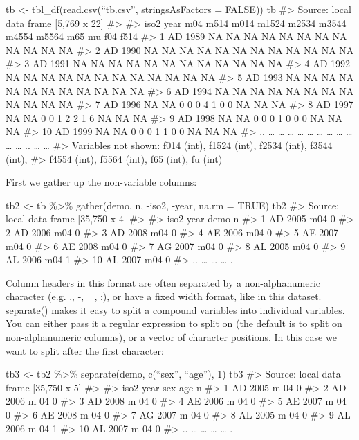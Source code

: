 \documentclass[]{article}
\begin{document}
tb \textless{}- tbl\_df(read.csv(``tb.csv'', stringsAsFactors = FALSE))
tb \#\textgreater{} Source: local data frame {[}5,769 x 22{]}
\#\textgreater{} \#\textgreater{} iso2 year m04 m514 m014 m1524 m2534
m3544 m4554 m5564 m65 mu f04 f514 \#\textgreater{} 1 AD 1989 NA NA NA NA
NA NA NA NA NA NA NA NA \#\textgreater{} 2 AD 1990 NA NA NA NA NA NA NA
NA NA NA NA NA \#\textgreater{} 3 AD 1991 NA NA NA NA NA NA NA NA NA NA
NA NA \#\textgreater{} 4 AD 1992 NA NA NA NA NA NA NA NA NA NA NA NA
\#\textgreater{} 5 AD 1993 NA NA NA NA NA NA NA NA NA NA NA NA
\#\textgreater{} 6 AD 1994 NA NA NA NA NA NA NA NA NA NA NA NA
\#\textgreater{} 7 AD 1996 NA NA 0 0 0 4 1 0 0 NA NA NA \#\textgreater{}
8 AD 1997 NA NA 0 0 1 2 2 1 6 NA NA NA \#\textgreater{} 9 AD 1998 NA NA
0 0 0 1 0 0 0 NA NA NA \#\textgreater{} 10 AD 1999 NA NA 0 0 0 1 1 0 0
NA NA NA \#\textgreater{} .. \ldots{} \ldots{} \ldots{} \ldots{}
\ldots{} \ldots{} \ldots{} \ldots{} \ldots{} \ldots{} \ldots{} ..
\ldots{} \ldots{} \#\textgreater{} Variables not shown: f014 (int),
f1524 (int), f2534 (int), f3544 (int), \#\textgreater{} f4554 (int),
f5564 (int), f65 (int), fu (int)

First we gather up the non-variable columns:

tb2 \textless{}- tb \%\textgreater{}\% gather(demo, n, -iso2, -year,
na.rm = TRUE) tb2 \#\textgreater{} Source: local data frame {[}35,750 x
4{]} \#\textgreater{} \#\textgreater{} iso2 year demo n \#\textgreater{}
1 AD 2005 m04 0 \#\textgreater{} 2 AD 2006 m04 0 \#\textgreater{} 3 AD
2008 m04 0 \#\textgreater{} 4 AE 2006 m04 0 \#\textgreater{} 5 AE 2007
m04 0 \#\textgreater{} 6 AE 2008 m04 0 \#\textgreater{} 7 AG 2007 m04 0
\#\textgreater{} 8 AL 2005 m04 0 \#\textgreater{} 9 AL 2006 m04 1
\#\textgreater{} 10 AL 2007 m04 0 \#\textgreater{} .. \ldots{} \ldots{}
\ldots{} .

Column headers in this format are often separated by a non-alphanumeric
character (e.g. ., -, \_, :), or have a fixed width format, like in this
dataset. separate() makes it easy to split a compound variables into
individual variables. You can either pass it a regular expression to
split on (the default is to split on non-alphanumeric columns), or a
vector of character positions. In this case we want to split after the
first character:

tb3 \textless{}- tb2 \%\textgreater{}\% separate(demo, c(``sex'',
``age''), 1) tb3 \#\textgreater{} Source: local data frame {[}35,750 x
5{]} \#\textgreater{} \#\textgreater{} iso2 year sex age n
\#\textgreater{} 1 AD 2005 m 04 0 \#\textgreater{} 2 AD 2006 m 04 0
\#\textgreater{} 3 AD 2008 m 04 0 \#\textgreater{} 4 AE 2006 m 04 0
\#\textgreater{} 5 AE 2007 m 04 0 \#\textgreater{} 6 AE 2008 m 04 0
\#\textgreater{} 7 AG 2007 m 04 0 \#\textgreater{} 8 AL 2005 m 04 0
\#\textgreater{} 9 AL 2006 m 04 1 \#\textgreater{} 10 AL 2007 m 04 0
\#\textgreater{} .. \ldots{} \ldots{} \ldots{} \ldots{} .
\end{document}
